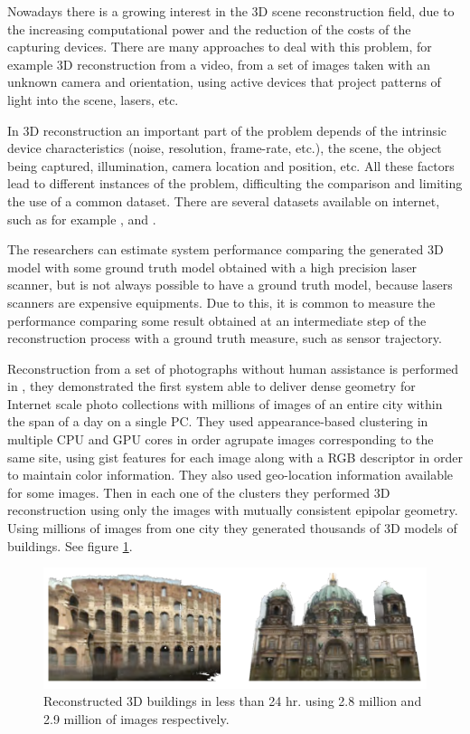  
Nowadays there is a growing interest in the 3D scene reconstruction field, due to the increasing computational power and the reduction of 
the costs of the capturing devices. There are many approaches to deal with this problem, for example 3D reconstruction 
from a video, from a set of images taken with an unknown camera and orientation, using active devices that project patterns of light into 
the scene, lasers, etc. 

In 3D reconstruction an important part of the problem depends of the intrinsic 
device characteristics (noise, resolution, frame-rate, etc.), the scene, the object being captured, illumination, camera location and position, etc. All these 
factors lead to different instances of the problem, difficulting the comparison and limiting the use of a common dataset. There are several datasets 
available on internet, such as for example \cite{sturm12iros},  \cite{LaiBRF11} and \cite{ShottonGZICF13}.

The researchers can estimate system performance comparing the generated 3D model with some 
ground truth model obtained with a high precision laser scanner, but is not always possible to have a ground truth model, because lasers scanners 
are expensive equipments. Due to this, it is common to measure the performance
 comparing some result obtained at an intermediate step of the reconstruction process with a ground truth measure, 
such as sensor trajectory.   

Reconstruction from a set of photographs without human assistance is performed in \cite{jan}, they demonstrated the first system able to deliver dense geometry for Internet scale photo collections with millions of images of an entire city within the span of a day on a single PC. They used appearance-based clustering in multiple CPU and GPU cores 
in order agrupate images corresponding to the same site, using gist features for each image along with a RGB
descriptor in order to maintain color information. They also used geo-location information available for some  images. 
Then in each one of the clusters they performed 3D reconstruction using only the images with mutually consistent epipolar 
geometry. Using millions of images from one city they generated thousands of 3D models of buildings. See figure \ref{fig:jan}. 


\begin{figure}[h!]
\begin{center}
\includegraphics[scale=0.25]{images/jan}
\caption{Reconstructed 3D buildings in less than 24 hr. using 2.8 million and 2.9 million of images respectively.}
\label{fig:jan}
\end{center}
\end{figure}


